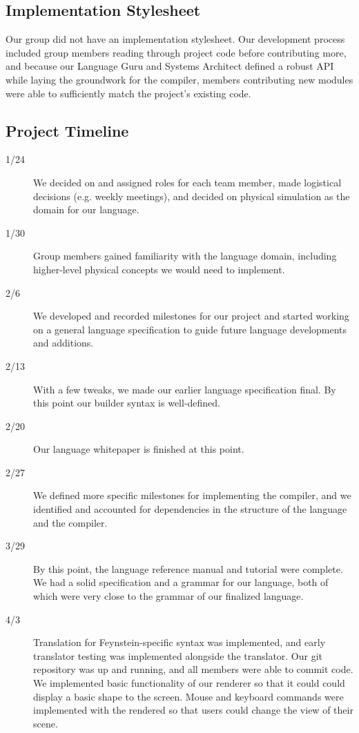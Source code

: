 \subsection{Implementation Stylesheet}
Our group did not have an implementation stylesheet. Our development
process included group members reading through project code before
contributing more, and because our Language Guru and Systems Architect
defined a robust API while laying the groundwork for the compiler,
members contributing new modules were able to sufficiently match the
project's existing code.

\subsection{Project Timeline}
\begin{description}
\item[1/24] We decided on and assigned roles for each team member,
  made logistical decisions (e.g. weekly meetings), and decided on
  physical simulation as the domain for our language.

\item[1/30] Group members gained familiarity with the language domain,
  including higher-level physical concepts we would need to implement.

\item[2/6] We developed and recorded milestones for our project and
  started working on a general language specification to guide future
  language developments and additions.

\item[2/13] With a few tweaks, we made our earlier language
  specification final. By this point our builder syntax is
  well-defined.

\item[2/20] Our language whitepaper is finished at this point.

\item[2/27] We defined more specific milestones for implementing the
  compiler, and we identified and accounted for dependencies in the
  structure of the language and the compiler.

\item[3/29] By this point, the language reference manual and tutorial
  were complete. We had a solid specification and a grammar for our
  language, both of which were very close to the grammar of our
  finalized language.

\item[4/3] Translation for Feynstein-specific syntax was implemented,
  and early translator testing was implemented alongside the
  translator. Our git repository was up and running, and all members
  were able to commit code. We implemented basic functionality of our
  renderer so that it could could display a basic shape to the
  screen. Mouse and keyboard commands were implemented with the
  rendered so that users could change the view of their scene.


\end{description}
